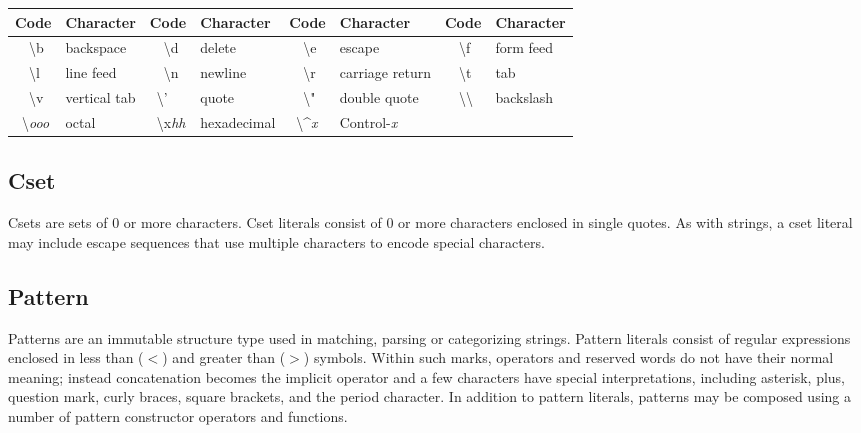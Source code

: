 \begin{center}
\begin{xtabular}{|m{0.38in}|m{0.8in}|m{0.4in}|m{0.855in}|m{0.38in}|m{1.14in}|m{0.38in}|m{0.68in}|}
\hline
{\sffamily\bfseries Code} &
{\sffamily\bfseries Character} &
{\sffamily\bfseries Code} &
{\sffamily\bfseries Character} &
{\sffamily\bfseries Code} &
{\sffamily\bfseries Character} &
{\sffamily\bfseries Code} &
{\sffamily\bfseries Character}\\\hline
\ \ {\textbackslash}b & backspace &
\ \ {\textbackslash}d & delete &
\ \ {\textbackslash}e & escape &
\ \ {\textbackslash}f & form feed\\\hline
\ \ {\textbackslash}l & line feed &
\ \ {\textbackslash}n & newline &
\ \ {\textbackslash}r & carriage return &
\ \ {\textbackslash}t & tab\\\hline
\ \ {\textbackslash}v & vertical tab &
\ {\textbackslash}' & quote &
\ \ {\textbackslash}" & double quote &
\ \ {\textbackslash}{\textbackslash} & backslash\\\hline
\ {\textbackslash}\textit{ooo} & octal &
\ {\textbackslash}x\textit{hh} & hexadecimal  &
\ {\textbackslash}\^{}\textit{x} & Control-\textit{x} &
~
 &
~
\\\hline
\end{xtabular}
\end{center}


\subsection*{Cset}

Csets are sets of 0 or more characters. Cset literals
consist of 0 or more characters enclosed in single quotes. As with
strings, a cset literal may include escape
sequences that use multiple characters to encode special characters.

\subsection*{Pattern}

Patterns are an immutable structure type used in
matching, parsing or categorizing strings.  Pattern literals consist
of regular expressions enclosed in less than ($<$) and greater than
($>$) symbols. Within such marks, operators and reserved words do not
have their normal meaning; instead concatenation becomes the implicit
operator and a few characters have special interpretations, including
asterisk, plus, question mark, curly braces, square brackets, and the
period character.  In addition to pattern literals, patterns may be
composed using a number of pattern constructor operators and functions.

